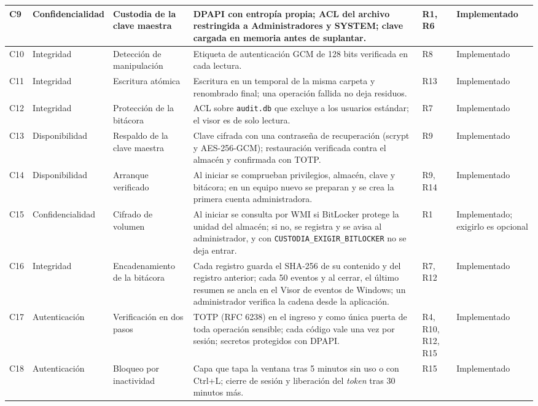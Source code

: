 \documentclass[conference]{IEEEtran}
\begin{document}
\begin{table}[!t]
\begin{tabular}{|l|p{1.95cm}|p{3.4cm}|p{6.6cm}|p{1.4cm}|p{2.15cm}|}
\hline
C9 & Confidencialidad & Custodia de la clave maestra & DPAPI con entropía propia; ACL del archivo restringida a Administradores y SYSTEM; clave cargada en memoria antes de suplantar. & R1, R6 & Implementado \\
\hline
C10 & Integridad & Detección de manipulación & Etiqueta de autenticación GCM de 128 bits verificada en cada lectura. & R8 & Implementado \\
\hline
C11 & Integridad & Escritura atómica & Escritura en un temporal de la misma carpeta y renombrado final; una operación fallida no deja residuos. & R13 & Implementado \\
\hline
C12 & Integridad & Protección de la bitácora & ACL sobre \texttt{audit.db} que excluye a los usuarios estándar; el visor es de solo lectura. & R7 & Implementado \\
\hline
C13 & Disponibilidad & Respaldo de la clave maestra & Clave cifrada con una contraseña de recuperación (scrypt y AES-256-GCM); restauración verificada contra el almacén y confirmada con TOTP. & R9 & Implementado \\
\hline
C14 & Disponibilidad & Arranque verificado & Al iniciar se comprueban privilegios, almacén, clave y bitácora; en un equipo nuevo se preparan y se crea la primera cuenta administradora. & R9, R14 & Implementado \\
\hline
C15 & Confidencialidad & Cifrado de volumen & Al iniciar se consulta por WMI si BitLocker protege la unidad del almacén; si no, se registra y se avisa al administrador, y con \texttt{CUSTODIA\_EXIGIR\_BITLOCKER} no se deja entrar. & R1 & Implementado; exigirlo es opcional \\
\hline
C16 & Integridad & Encadenamiento de la bitácora & Cada registro guarda el SHA-256 de su contenido y del registro anterior; cada 50 eventos y al cerrar, el último resumen se ancla en el Visor de eventos de Windows; un administrador verifica la cadena desde la aplicación. & R7, R12 & Implementado \\
\hline
C17 & Autenticación & Verificación en dos pasos & TOTP (RFC 6238) en el ingreso y como única puerta de toda operación sensible; cada código vale una vez por sesión; secretos protegidos con DPAPI. & R4, R10, R12, R15 & Implementado \\
\hline
C18 & Autenticación & Bloqueo por inactividad & Capa que tapa la ventana tras 5 minutos sin uso o con Ctrl+L; cierre de sesión y liberación del \textit{token} tras 30 minutos más. & R15 & Implementado \\
\hline

\end{tabular}
\end{table}
\end{document}
